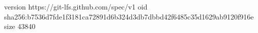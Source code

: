 version https://git-lfs.github.com/spec/v1
oid sha256:b7536d7fde1f3181ca72891d6b324d3db7dbbd42f6485c35d1629ab9120f916e
size 43840
